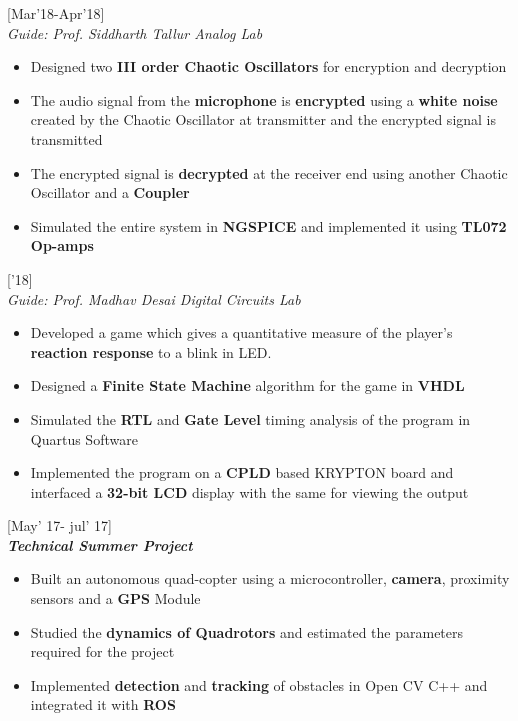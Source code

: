 \documentclass{article}
\begin{document}
 \hfill{\small [Mar'18-Apr'18]}\\
{\it Guide: Prof. Siddharth Tallur \textbar Analog Lab} \\
\vspace{-17pt}
\begin{itemize}[itemsep = -0.75 mm, leftmargin=*]
\item Designed two {\bf III order Chaotic Oscillators} for encryption and decryption
\item The audio signal from the {\bf microphone} is {\bf encrypted} using a {\bf white noise} created by the Chaotic Oscillator at transmitter and the encrypted signal is transmitted
\item The encrypted signal is {\bf decrypted} at the receiver end using another Chaotic Oscillator and a {\bf Coupler}
\item Simulated the entire system in {\bf NGSPICE} and implemented it using {\bf TL072 Op-amps}
\end{itemize}
 \hfill{\small ['18]}\\
{\it Guide: Prof. Madhav Desai \textbar Digital Circuits Lab} \\
\vspace{-17pt}
\begin{itemize}[itemsep = -0.75 mm, leftmargin=*]
\item Developed a game which gives a quantitative measure of the player's {\bf reaction response} to a blink in LED.
\item Designed a {\bf Finite State Machine} algorithm for the game in {\bf VHDL}
\item Simulated the {\bf RTL} and {\bf Gate Level} timing analysis of the program in Quartus Software
\item Implemented the program on a {\bf CPLD} based KRYPTON board and interfaced a {\bf 32-bit LCD} display with the same for viewing the output
\end{itemize}
 \hfill{\small [May' 17- jul' 17]}\\
{\it \textbf{Technical Summer Project}} \\
\vspace{-17pt}
\begin{itemize}[itemsep = -0.75 mm, leftmargin=*]
\item Built an autonomous quad-copter using a microcontroller, {\bf camera}, proximity sensors and a {\bf GPS} Module
\item Studied the {\bf dynamics of Quadrotors} and estimated the parameters required for the project
\item Implemented {\bf detection} and {\bf tracking} of obstacles in Open CV C++ and integrated it with {\bf ROS}
\end{itemize}
\end{document}
